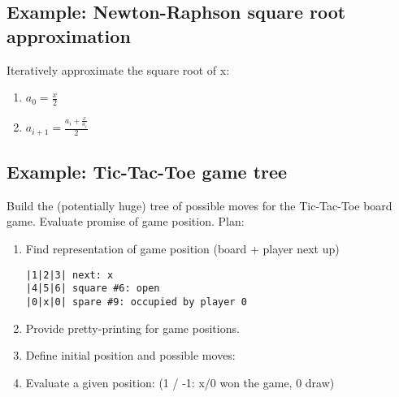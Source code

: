 \subsection{Example: Newton-Raphson square root approximation}
Iteratively approximate the square root of x:
\begin{enumerate}
   \item $a_0 = \tfrac{x}{2}$
   \item $a_{i+1} = \tfrac{a_i+\tfrac{x}{a_i}}{2}$
\end{enumerate}


%

\subsection{Example: Tic-Tac-Toe game tree}
Build the (potentially huge) tree of possible moves for the Tic-Tac-Toe board game. Evaluate promise of game position. 
Plan:
\begin{enumerate}
   \item Find representation of game position (board + player next up)
\begin{verbatim}
|1|2|3| next: x
|4|5|6| square #6: open 
|0|x|0| spare #9: occupied by player 0
\end{verbatim}
   \item Provide pretty-printing for game positions.
   \item Define initial position and possible moves: 
   \item Evaluate a given position:  (1 / -1: x/0 won the game, 0 draw)
\end{enumerate}

